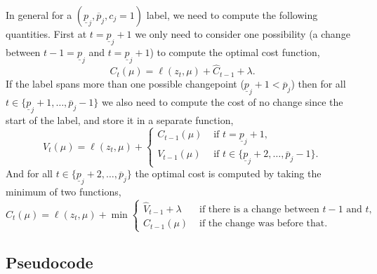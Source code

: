 \documentclass{article}
\begin{document}
In general for a $(\underline p_j,\overline p_j,c_j=1)$ label, we need
to compute the following quantities. First at $t=\underline p_j+1$ we
only need to consider one possibility (a change between
$t-1=\underline p_j$ and $t=\underline p_j+1$) to compute the optimal
cost function,
\begin{equation}
  \label{eq:c1init}
  C_t(\mu) = \ell(z_t, \mu) + \hat C_{t-1} + \lambda.
\end{equation}
If the label spans more than one possible changepoint
($\underline p_j+1<\overline p_j$) then for all
$t\in\{\underline p_j+1,\dots,\overline p_j-1\}$ we also need to
compute the cost of no change since the start of the label, and store
it in a separate function,
\begin{equation}
  \label{eq:c1v}
  V_t(\mu) = \ell(z_t, \mu) +
  \begin{cases}
    C_{t-1}(\mu) & \text{ if } t=\underline p_j+1,\\
    V_{t-1}(\mu) & \text{ if } t\in\{\underline p_j+2,\dots,\overline p_j-1\}.
  \end{cases}
\end{equation}
And for all $t\in\{\underline p_j+2,\dots,\overline p_j\}$ the optimal
cost is computed by taking the minimum of two functions,
\begin{equation}
  \label{eq:positive_update}
  C_t(\mu)=\ell(z_t, \mu) + \min
  \begin{cases}
\hat V_{t-1}+\lambda &\text{ if there is a change between $t-1$ and $t$,}\\
C_{t-1}(\mu) & \text{ if the change was before that.}
  \end{cases}
\end{equation}

\subsection{Pseudocode}
\end{document}

